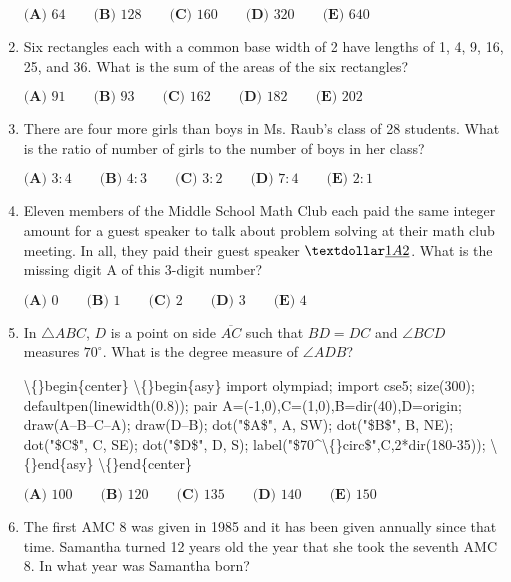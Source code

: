 \documentclass{article}
\begin{document}
\begin{enumerate}[label=\arabic*., itemsep=0.5em]
\( \textbf{(A) }64\qquad\textbf{(B) }128\qquad\textbf{(C) }160\qquad\textbf{(D) }320\qquad\textbf{(E) }640 \)\par \vspace{0.5em}\item Six rectangles each with a common base width of 2 have lengths of 1, 4, 9, 16, 25, and 36. What is the sum of the areas of the six rectangles?

\( \textbf{(A) }91\qquad\textbf{(B) }93\qquad\textbf{(C) }162\qquad\textbf{(D) }182\qquad\textbf{(E) }202 \)\par \vspace{0.5em}\item There are four more girls than boys in Ms. Raub's class of 28 students. What is the ratio of number of girls to the number of boys in her class?

\( \textbf{(A) }3 : 4\qquad\textbf{(B) }4 : 3\qquad\textbf{(C) }3 : 2\qquad\textbf{(D) }7 : 4\qquad\textbf{(E) }2 : 1 \)\par \vspace{0.5em}\item Eleven members of the Middle School Math Club each paid the same integer amount for a guest speaker to talk about problem solving at their math club meeting. In all, they paid their guest speaker \(\textdollar\underline{1}\underline{A}\underline{2} \). What is the missing digit A of this 3-digit number?

\( \textbf{(A) }0\qquad\textbf{(B) }1\qquad\textbf{(C) }2\qquad\textbf{(D) }3\qquad\textbf{(E) }4 \)\par \vspace{0.5em}\item In \(\bigtriangleup ABC\), \(D\) is a point on side \(\overline{AC}\) such that \(BD=DC\) and \(\angle BCD\) measures \(70^\circ\). What is the degree measure of \(\angle ADB\)?


\textbackslash\{\}begin\{center\}
\textbackslash\{\}begin\{asy\}
import olympiad;
import cse5;
size(300);
defaultpen(linewidth(0.8));
pair A=(-1,0),C=(1,0),B=dir(40),D=origin;
draw(A--B--C--A);
draw(D--B);
dot("\$A\$", A, SW);
dot("\$B\$", B, NE);
dot("\$C\$", C, SE);
dot("\$D\$", D, S);
label("\$70\^{}\textbackslash\{\}circ\$",C,2*dir(180-35));
\textbackslash\{\}end\{asy\}
\textbackslash\{\}end\{center\}


\(\textbf{(A) }100\qquad\textbf{(B) }120\qquad\textbf{(C) }135\qquad\textbf{(D) }140\qquad \textbf{(E) }150\)\par \vspace{0.5em}\item The first AMC 8 was given in 1985 and it has been given annually since that time. Samantha turned 12 years old the year that she took the seventh AMC 8. In what year was Samantha born?


\end{enumerate}
\end{document}
